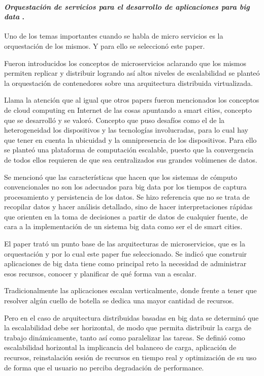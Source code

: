 
\paragraph{
    \textbf{\emph{Orquestación de servicios para el desarrollo de aplicaciones para big data}}
    \cite{orquestacion}.
}

Uno de los temas importantes cuando se habla de micro servicios es la orquestación de los mismos. Y para ello se seleccionó este paper.

Fueron introducidos los conceptos de microservicios aclarando que los mismos permiten replicar y distribuir logrando así altos niveles de escalabilidad se planteó la orquestación de contenedores sobre una arquitectura distribuida virtualizada.

Llama la atención que al igual que otros papers fueron mencionados los conceptos de cloud computing en Internet de las cosas apuntando a smart cities, concepto que se desarrolló y se valoró. Concepto que puso desafíos como el de la heterogeneidad los dispositivos y las tecnologías involucradas, para lo cual hay que tener en cuenta la ubicuidad y la omnipresencia de los dispositivos.
Para ello se planteó una plataforma de computación escalable, puesto que la convergencia de todos ellos requieren de que sea centralizados sus grandes  volúmenes de datos.

Se mencionó que las características que hacen que los sistemas de cómputo convencionales no son los adecuados para big data por los tiempos de captura procesamiento y persistencia de los datos. Se hizo referencia que no se trata de recopilar datos y hacer análisis detallado, sino de hacer interpretaciones rápidas que orienten en la toma de decisiones a partir de datos de cualquier fuente, de cara a la implementación de un sistema big data como ser el de smart cities.


El paper trató un punto base de las arquitecturas de microservicios, que es la orquestación y por lo cual este paper fue seleccionado. Se indicó que construir aplicaciones de big data tiene como principal reto la necesidad de administrar esos recursos, conocer y planificar de qué forma van a escalar.

Tradicionalmente las aplicaciones escalan verticalmente, donde frente a tener que resolver algún cuello de botella se dedica una mayor cantidad de recursos.

Pero en el caso de arquitectura distribuidas basadas en big data se determinó que la escalabilidad debe ser horizontal, de modo que permita distribuir la carga de trabajo dinámicamente, tanto así como paralelizar las tareas.
Se definió como escalabilidad horizontal la implicancia del balanceo de carga, aplicación de recursos, reinstalación sesión de recursos en tiempo real y optimización de su uso de forma que el usuario no perciba degradación de performance.


